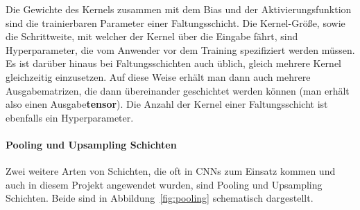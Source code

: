 Die Gewichte des Kernels zusammen mit dem Bias und der
Aktivierungsfunktion sind die trainierbaren
Parameter einer Faltungsschicht. Die Kernel-Gr\"o{\ss}e, sowie die
Schrittweite, mit welcher der Kernel \"uber die Eingabe f\"ahrt,
sind Hyperparameter, die vom Anwender vor dem Training spezifiziert werden
m\"ussen.
Es ist dar\"uber hinaus bei Faltungsschichten auch \"ublich, gleich
mehrere Kernel gleichzeitig einzusetzen. Auf diese Weise erh\"alt man
dann auch mehrere Ausgabematrizen, die dann \"ubereinander geschichtet
werden k\"onnen (man erh\"alt also einen Ausgabe\textbf{tensor}).
Die Anzahl der Kernel einer Faltungsschicht ist ebenfalls
ein Hyperparameter.

\paragraph{Pooling und Upsampling Schichten}

Zwei weitere Arten von Schichten, die oft in CNNs zum Einsatz kommen und
auch in diesem Projekt angewendet wurden, sind Pooling und Upsampling
Schichten. Beide sind in Abbildung~\ref{fig:pooling} schematisch
dargestellt.

